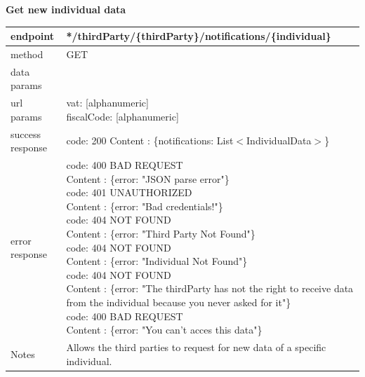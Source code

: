 \begin{legal}
\begin{legal}
\begin{itemize}
								\textbf{Get new individual data} \\
			
								\begin{tabularx}{\linewidth}{| l| l }
									\hline
									endpoint & */thirdParty/\{thirdParty\}/notifications/\{individual\} \\
									\hline
									method & GET \\
									\hline
									data params & \\
									\hline
									url params &
									\parbox{0.7\textwidth}{
										\bigskip
										vat: [alphanumeric]\\
										fiscalCode: [alphanumeric]
										\bigskip
									} \\
									\hline
									success response &
									\parbox{0.7\textwidth}{
										\bigskip
										code: 200\\
										Content : \{notifications: List$<$IndividualData$>$\}
										\bigskip
									} \\
									\hline
									error response &
									\parbox{0.7\textwidth}{
										\bigskip
										code: 400 BAD REQUEST \\
										Content : \{error: "JSON parse error"\}\\
										code: 401 UNAUTHORIZED \\
										Content : \{error: "Bad credentials!"\}\\
										code: 404 NOT FOUND \\
										Content : \{error: "Third Party Not Found"\}\\
										code: 404 NOT FOUND \\
										Content : \{error: "Individual Not Found"\}\\
										code: 404 NOT FOUND \\
										Content : \{error: "The thirdParty has not the right to receive data from the individual because you never asked for it"\}\\
										code: 400 BAD REQUEST \\
										Content : \{error: "You can't acces this data"\}\\
										\bigskip
									} \\
									\hline
									Notes & 
									\parbox{0.7\textwidth}{
										\bigskip Allows the third parties to request for new data of a specific individual.
									\bigskip}  \\
									\hline
								\end{tabularx}\\
								

\end{itemize}
\end{legal}
\end{legal}

